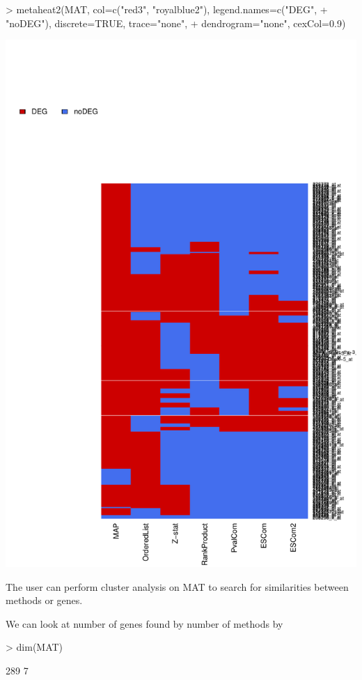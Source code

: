 \documentclass[a4paper]{report}
\begin{document}
\begin{center}
\begin{Schunk}
\begin{Sinput}
> metaheat2(MAT, col=c("red3", "royalblue2"), legend.names=c("DEG",
+ "noDEG"), discrete=TRUE, trace="none", 
+ dendrogram="none", cexCol=0.9)
\end{Sinput}
\end{Schunk}
\includegraphics{MAMA-019}
\end{center}
The user can perform cluster analysis on {\ttfamily MAT} to search for similarities between methods or genes.\par
We can look at number of genes found by number of methods by
\begin{Schunk}
\begin{Sinput}
> dim(MAT)
\end{Sinput}
\begin{Soutput}
[1] 289   7
\end{Soutput}
\end{Schunk}
\end{document}
